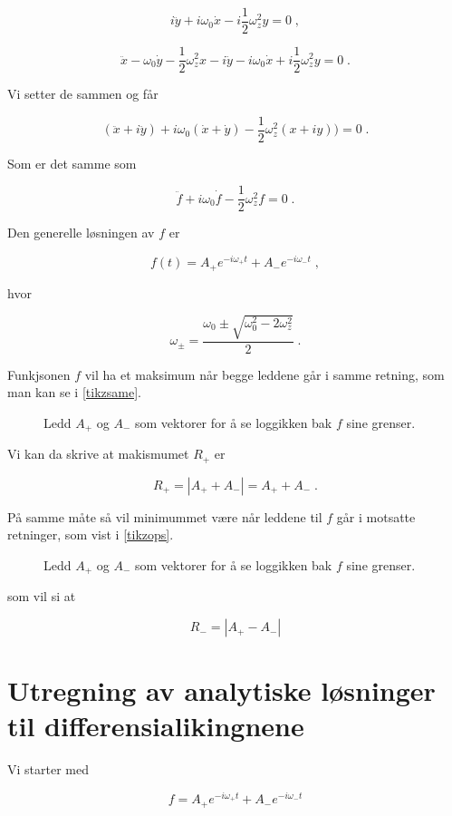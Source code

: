 \documentclass[reprint,english,notitlepage, nofootinbib]{revtex4-1}  %
\begin{document}
$$i\ddot{y} + i\omega_0 \dot{x} - i\frac{1}{2}\omega_z^2 y = 0 \; ,$$

$$ \ddot{x} - \omega_0 \dot{y} - \frac{1}{2}\omega_z^2 x -i\ddot{y} - i\omega_0 \dot{x} + i\frac{1}{2}\omega_z^2 y = 0 \; .$$

Vi setter de sammen og får


$$(\ddot{x} + i\ddot{y}) + i\omega_0(\dot{x} + \dot{y}) - \frac{1}{2}\omega_z^2(x+iy) ) = 0 \; .$$
  
Som er det samme som

$$\ddot{f} + i\omega_0 \dot{f} - \frac{1}{2}\omega_z^2f = 0 \; .$$

Den generelle løsningen av $f$ er

$$f(t) =A_+e^{-i\omega_+ t} + A_-e^{-i\omega_- t} \; ,$$

hvor

$$\omega_{\pm} = \frac{\omega_0 \pm \sqrt{\omega_0^2 - 2\omega_z^2}}{2} \; .$$

Funkjsonen $f$ vil ha et maksimum når begge leddene går i samme retning, som man kan se i \autoref{tikzsame}. 

\begin{figure}
\scalebox{0.7}{}
\caption{Ledd $A_+$ og $A_-$ som vektorer for å se loggikken bak $f$ sine grenser.}
\label{tikzsame}
\end{figure}

Vi kan da skrive at makismumet $R_+$ er

$$R_+ = |A_+ + A_-| = A_+ + A_- \; .$$

På samme måte så vil minimummet være når leddene til $f$ går i motsatte retninger, som vist i \autoref{tikzops}. 

\begin{figure}
\centering
\scalebox{0.7}{}
\caption{Ledd $A_+$ og $A_-$ som vektorer for å se loggikken bak $f$ sine grenser.}
\label{tikzops}
\end{figure}

som vil si at

$$R_- = |A_+ - A_-|$$

\section{Utregning av analytiske løsninger til differensialikingnene}\label{DiffA}

Vi starter med

$$f = A_+e^{-i\omega_+t} + A_-e^{-i\omega_-t}$$
\end{document}
